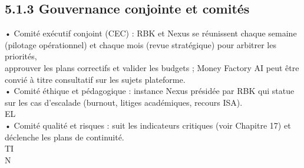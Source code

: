 \documentclass[12pt,landscape,a4paper]{article}
\begin{document}
\subsection{5.1.3 Gouvernance conjointe et comités}
• Comité exécutif conjoint (CEC) : RBK et Nexus se réunissent chaque semaine (pilotage opérationnel) et chaque mois (revue stratégique) pour arbitrer les priorités,\\
approuver les plans correctifs et valider les budgets ; Money Factory AI peut être convié à titre consultatif sur les sujets plateforme.\\
• Comité éthique et pédagogique : instance Nexus présidée par RBK qui statue sur les cas d’escalade (burnout, litiges académiques, recours ISA).\\
\vspace{0.5em}
\vspace{0.5em}
\vspace{0.5em}
\vspace{0.5em}
EL\\
• Comité qualité et risques : suit les indicateurs critiques (voir Chapitre 17) et déclenche les plans de continuité.\\
\vspace{0.5em}
\vspace{0.5em}
\vspace{0.5em}
\vspace{0.5em}
TI\\
N\\
\end{document}

